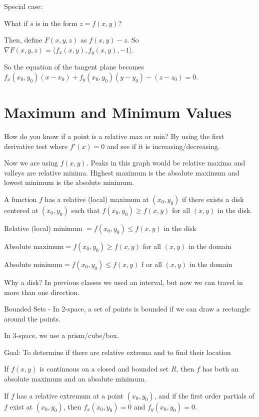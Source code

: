 \documentclass[../calc3.tex]{subfiles}
\begin{document}
Special case:

What if $s$ is in the form $z=f(x,y)$?

Then, define $F(x,y,z)$ as $f(x,y)-z$. So $\nabla F(x,y,z)=\langle f_x(x,y),f_y(x,y),-1\rangle$.

So the equation of the tangent plane becomes $f_x(x_0,y_0)(x-x_0)+f_y(x_0,y_0)(y-y_0)-(z-z_0)=0$.

\section{Maximum and Minimum Values}
How do you know if a point is a relative max or min? By using the first derivative test where $f'(x)=0$ and see if it is increasing/decreasing.

Now we are using $f(x,y)$. Peaks in this graph would be relative maxima and valleys are relative minima. Highest maximum is the absolute maximum and lowest minimum is the absolute minimum.

\begin{definition}
    A function $f$ has a relative (local) maximum at $(x_0, y_0)$ if there exists a disk centered at $(x_0,y_0)$ such that $f(x_0,y_0)\geq f(x,y)$ for all $(x,y)$ in the disk.

    Relative (local) minimum $= f(x_0,y_0)\leq f(x,y)$ in the disk 

    Absolute maximum$=f(x_0,y_0)\geq f(x,y)$ for all $(x,y)$ in the domain 

    Absolute minimum$=f(x_0,y_0)\leq f(x,y)$ f or all $(x,y)$ in the domain

    Why a disk? In previous classes we used an interval, but now we can travel in more than one direction.
\end{definition}

Bounded Sets - In 2-space, a set of points is bounded if we can draw a rectangle around the points.

In 3-space, we use a prism/cube/box.

Goal: To determine if there are relative extrema and to find their location 
\begin{theorem}
    If $f(x,y)$ is continuous on a closed and bounded set $R$, then $f$ has both an absolute maximum and an absolute minimum.
\end{theorem}

\begin{theorem}
    If $f$ has a relative extremum at a point $(x_0,y_0)$, and if the first order partials of $f$ exist at $(x_0,y_0)$, then $f_x(x_0, y_0)=0$ and $f_y(x_0,y_0)=0$.
\end{theorem}
\end{document}
